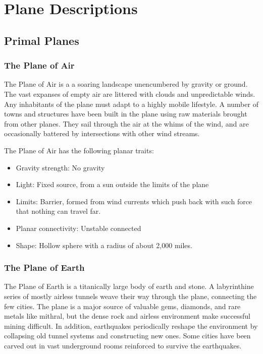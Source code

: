 
\section{Plane Descriptions}

    \subsection{Primal Planes}

        \subsubsection{The Plane of Air}
        The Plane of Air is a a soaring landscape unencumbered by gravity or ground.
        The vast expanses of empty air are littered with clouds and unpredictable winds.
        Any inhabitants of the plane must adapt to a highly mobile lifestyle.
        A number of towns and structures have been built in the plane using raw materials brought from other planes.
        They sail through the air at the whims of the wind, and are occasionally battered by intersections with other wind streams.

        The Plane of Air has the following planar traits:
        \begin{itemize}
            \item Gravity strength: No gravity
            \item Light: Fixed source, from a sun outside the limits of the plane
            \item Limits: Barrier, formed from wind currents which push back with such force that nothing can travel far.
            \item Planar connectivity: Unstable connected
            \item Shape: Hollow sphere with a radius of about 2,000 miles.
        \end{itemize}

        \subsubsection{The Plane of Earth}
        The Plane of Earth is a titanically large body of earth and stone.
        A labyrinthine series of mostly airless tunnels weave their way through the plane, connecting the few cities.
        The plane is a major source of valuable gems, diamonds, and rare metals like mithral, but the dense rock and airless environment make successful mining difficult.
        In addition, earthquakes periodically reshape the environment by collapsing old tunnel systems and constructing new ones.
        Some cities have been carved out in vast underground rooms reinforced to survive the earthquakes.


